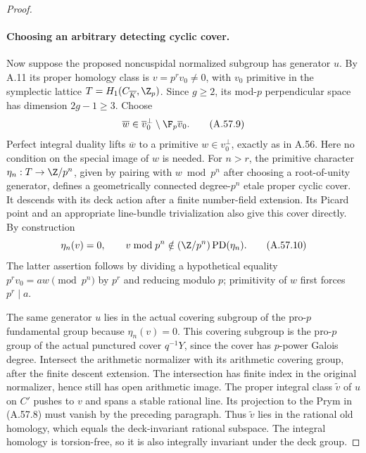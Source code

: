 \begin{proof}
\paragraph{Choosing an arbitrary detecting cyclic cover.}
Now suppose the proposed noncuspidal normalized subgroup
has generator \(u\). By A.11 its proper homology class is
\(v=p^r v_0\ne0\), with \(v_0\) primitive in the
symplectic lattice \(T=H_1(C_{\overline K},\Z_p)\).
Since \(g\ge2\), its mod-\(p\) perpendicular space has
dimension \(2g-1\ge3\). Choose
\[
       \overline w\in\overline v_0^\perp
                           \setminus\F_p\overline v_0.
                                                        \tag{A.57.9}
\]
Perfect integral duality lifts \(\overline w\) to a
primitive \(w\in v_0^\perp\), exactly as in A.56.
Here no condition on the special image of \(w\) is needed.
For \(n>r\), the primitive character
\(\eta_n:T\to\Z/p^n\), given by pairing with
\(w\bmod p^n\) after choosing a root-of-unity generator,
defines a geometrically connected degree-\(p^n\) etale
proper cyclic cover. It descends with its deck action
after a finite number-field extension. Its Picard point
and an appropriate line-bundle trivialization also give
this cover directly. By construction
\[
       \eta_n(v)=0,
       \qquad v\bmod p^n\notin
                    (\Z/p^n)\operatorname{PD}(\eta_n).
                                                        \tag{A.57.10}
\]
The latter assertion follows by dividing a hypothetical
equality \(p^rv_0=a w\pmod {p^n}\) by \(p^r\)
and reducing modulo \(p\); primitivity of \(w\)
first forces \(p^r\mid a\).

The same generator \(u\) lies in the actual covering
subgroup of the pro-\(p\) fundamental group because
\(\eta_n(v)=0\). This covering subgroup is the pro-\(p\)
group of the actual punctured cover \(q^{-1}Y\), since
the cover has \(p\)-power Galois degree. Intersect the
arithmetic normalizer with its arithmetic covering group,
after the finite descent extension. The intersection has
finite index in the original normalizer, hence still has
open arithmetic image. The proper integral class
\(\widetilde v\) of \(u\) on \(C'\) pushes to \(v\)
and spans a stable rational line. Its projection to the
Prym in (A.57.8) must vanish by the preceding paragraph.
Thus \(\widetilde v\) lies in the rational old homology,
which equals the deck-invariant rational subspace.
The integral homology is torsion-free, so it is also
integrally invariant under the deck group.


\end{proof}
